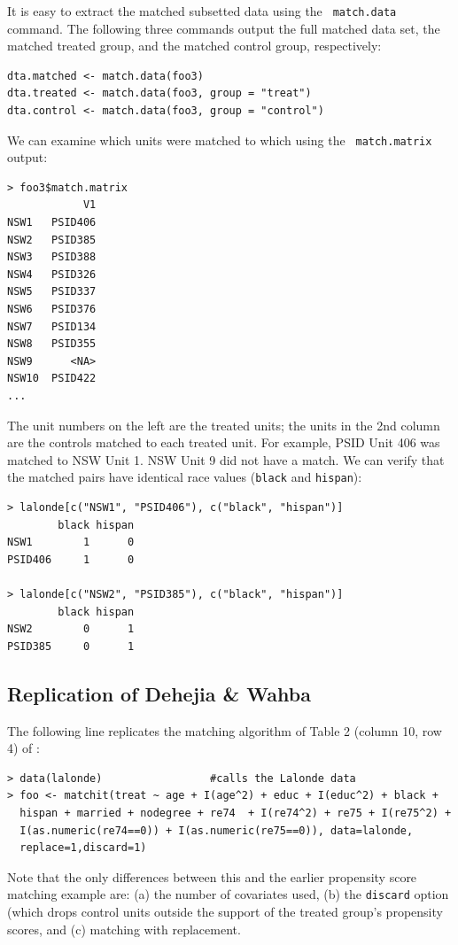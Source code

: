 \documentclass[oneside,letterpaper,titlepage]{article}
\begin{document}
It is easy to extract the matched subsetted data using the {\tt
  match.data} command.  The following three commands output the full
matched data set, the matched treated group, and the matched control
group, respectively:

\begin{verbatim}
dta.matched <- match.data(foo3)
dta.treated <- match.data(foo3, group = "treat")
dta.control <- match.data(foo3, group = "control")
\end{verbatim}

We can examine which units were matched to which using the {\tt
  match.matrix} output:
\begin{verbatim}
> foo3$match.matrix
            V1
NSW1   PSID406
NSW2   PSID385
NSW3   PSID388
NSW4   PSID326
NSW5   PSID337
NSW6   PSID376
NSW7   PSID134
NSW8   PSID355
NSW9      <NA>
NSW10  PSID422
...  
\end{verbatim}

The unit numbers on the left are the treated units; the units in the
2nd column are the controls matched to each treated unit.  For
example, PSID Unit 406 was matched to NSW Unit 1.  NSW Unit 9 did not
have a match.  We can verify that the matched pairs have identical race values 
(\texttt{black} and \texttt{hispan}):

\begin{verbatim}
> lalonde[c("NSW1", "PSID406"), c("black", "hispan")]
        black hispan
NSW1        1      0
PSID406     1      0

> lalonde[c("NSW2", "PSID385"), c("black", "hispan")]
        black hispan
NSW2        0      1
PSID385     0      1
\end{verbatim}


\subsection{Replication of Dehejia \& Wahba}

The following line replicates the matching algorithm of Table 2
(column 10, row 4) of \citet{DehWah99}:

\begin{verbatim}
> data(lalonde)                 #calls the Lalonde data
> foo <- matchit(treat ~ age + I(age^2) + educ + I(educ^2) + black +
  hispan + married + nodegree + re74  + I(re74^2) + re75 + I(re75^2) +
  I(as.numeric(re74==0)) + I(as.numeric(re75==0)), data=lalonde,
  replace=1,discard=1)
\end{verbatim}

Note that the only differences between this and the earlier propensity
score matching example are: (a) the number of covariates used, (b) the
\texttt{discard} option (which drops control units outside the support
of the treated group's propensity scores, and (c) matching with
replacement.
\end{document}
